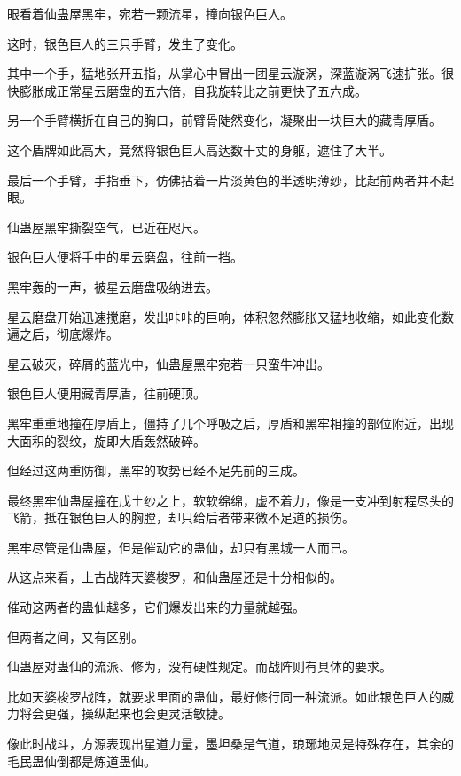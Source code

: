 
\begin{this_body}

眼看着仙蛊屋黑牢，宛若一颗流星，撞向银色巨人。

这时，银色巨人的三只手臂，发生了变化。

其中一个手，猛地张开五指，从掌心中冒出一团星云漩涡，深蓝漩涡飞速扩张。很快膨胀成正常星云磨盘的五六倍，自我旋转比之前更快了五六成。

另一个手臂横折在自己的胸口，前臂骨陡然变化，凝聚出一块巨大的藏青厚盾。

这个盾牌如此高大，竟然将银色巨人高达数十丈的身躯，遮住了大半。

最后一个手臂，手指垂下，仿佛拈着一片淡黄色的半透明薄纱，比起前两者并不起眼。

仙蛊屋黑牢撕裂空气，已近在咫尺。

银色巨人便将手中的星云磨盘，往前一挡。

黑牢轰的一声，被星云磨盘吸纳进去。

星云磨盘开始迅速搅磨，发出咔咔的巨响，体积忽然膨胀又猛地收缩，如此变化数遍之后，彻底爆炸。

星云破灭，碎屑的蓝光中，仙蛊屋黑牢宛若一只蛮牛冲出。

银色巨人便用藏青厚盾，往前硬顶。

黑牢重重地撞在厚盾上，僵持了几个呼吸之后，厚盾和黑牢相撞的部位附近，出现大面积的裂纹，旋即大盾轰然破碎。

但经过这两重防御，黑牢的攻势已经不足先前的三成。

最终黑牢仙蛊屋撞在戊土纱之上，软软绵绵，虚不着力，像是一支冲到射程尽头的飞箭，抵在银色巨人的胸膛，却只给后者带来微不足道的损伤。

黑牢尽管是仙蛊屋，但是催动它的蛊仙，却只有黑城一人而已。

从这点来看，上古战阵天婆梭罗，和仙蛊屋还是十分相似的。

催动这两者的蛊仙越多，它们爆发出来的力量就越强。

但两者之间，又有区别。

仙蛊屋对蛊仙的流派、修为，没有硬性规定。而战阵则有具体的要求。

比如天婆梭罗战阵，就要求里面的蛊仙，最好修行同一种流派。如此银色巨人的威力将会更强，操纵起来也会更灵活敏捷。

像此时战斗，方源表现出星道力量，墨坦桑是气道，琅琊地灵是特殊存在，其余的毛民蛊仙倒都是炼道蛊仙。


\end{this_body}
